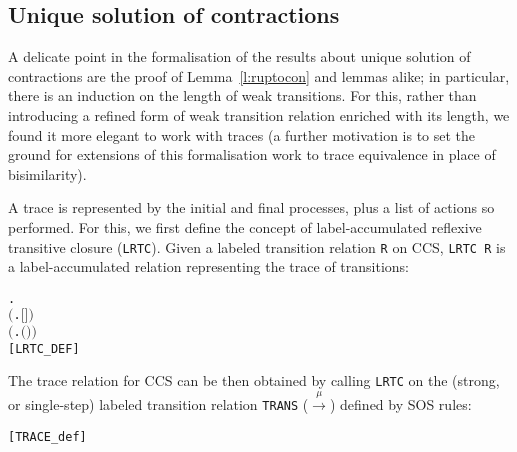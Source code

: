 \subsection{Unique solution of contractions}

A delicate point in the formalisation of the results about unique solution of
contractions are the proof of Lemma~\ref{l:ruptocon} and lemmas alike;
in particular, there is
 an induction on the length of weak transitions. 
For this, rather than 
 introducing a refined form of weak transition relation
enriched with its length, 
we found it more elegant  to  work with traces
(a further motivation  is to set the ground for extensions of this
formalisation work to trace equivalence in place of bisimilarity).



A trace is represented by the initial and final processes, plus
a list of actions  so performed.
For this, we first 
 define the concept of label-accumulated reflexive transitive closure
 (\texttt{LRTC}).
Given a labeled transition relation \texttt{R} on CCS, \texttt{LRTC R} is
a label-accumulated relation representing the trace of transitions:
\begin{alltt}
        \HOLTokenDefEquality{}
     \HOLSymConst{\HOLTokenForall{}}.
         \ensuremath{(}\HOLSymConst{\HOLTokenForall{}}.   \ensuremath{[}\ensuremath{]} \ensuremath{)} \HOLSymConst{\HOLTokenConj{}}
         \ensuremath{(}\HOLSymConst{\HOLTokenForall{}}    .     \HOLSymConst{\HOLTokenConj{}}     \HOLSymConst{\HOLTokenImp{}}   \ensuremath{(}\HOLSymConst{::}\ensuremath{)} \ensuremath{)} \HOLSymConst{\HOLTokenImp{}}
            \hfill{[LRTC_DEF]}
\end{alltt}
The trace relation for CCS can be then obtained
 by calling \texttt{LRTC} on the (strong, or single-step) labeled transition
 relation \texttt{TRANS} ($\overset{\mu}{\rightarrow}$) defined by SOS rules:
\begin{alltt}
    \HOLTokenDefEquality{}  \hfill{[TRACE_def]}
\end{alltt}

